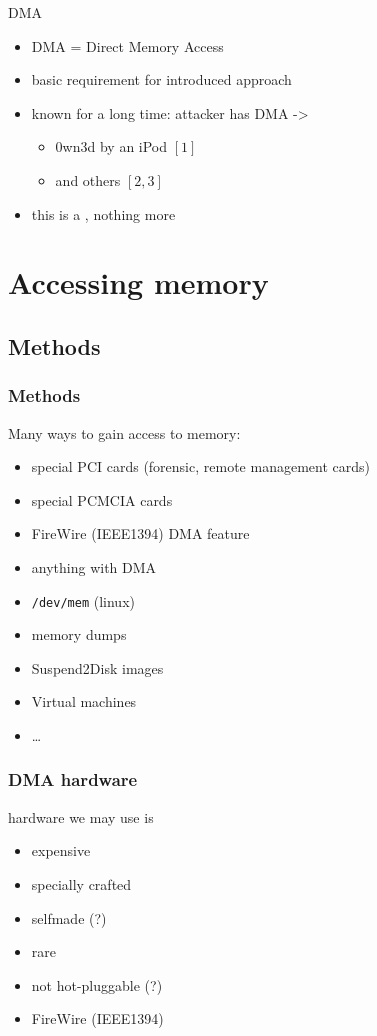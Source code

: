 \documentclass{beamer}
\newenvironment{itemizeframe}[1]
  {\begin{frame}{#1}\startitemizeframe}
  {\stopitemizeframe\end{frame}}
\newcommand\startitemizeframe{\begin{itemize}}
\newcommand\stopitemizeframe{\end{itemize}}
\begin{document}
		\begin{itemizeframe}{DMA}
			\item DMA = Direct Memory Access
			\item basic requirement for introduced approach
			\item known for a long time: attacker has DMA -> 
				\begin{itemize}
					\item 0wn3d by an iPod $[1]$
					\item and others $[2,3]$
				\end{itemize}
			\item this is a , nothing more
		\end{itemizeframe}

\section{Accessing memory}

	\subsection{Methods}

		\begin{frame} \frametitle{Methods}
			Many ways to gain access to memory:
			\begin{itemize}
				\item special PCI cards (forensic, remote management cards)
				\item special PCMCIA cards
				\item FireWire (IEEE1394) DMA feature
				\item anything with DMA
				\item \texttt{/dev/mem} (linux)
				\item memory dumps
				\item Suspend2Disk images
				\item Virtual machines
				\item \ldots
			\end{itemize}
		\end{frame}

		\begin{frame} \frametitle{DMA hardware}
			hardware we may use is
			\begin{itemize}
				\item expensive
				\item specially crafted
				\item selfmade (?)
				\item rare
				\item not hot-pluggable (?)
				\item {} FireWire (IEEE1394)
			\end{itemize}
		\end{frame}
\end{document}
